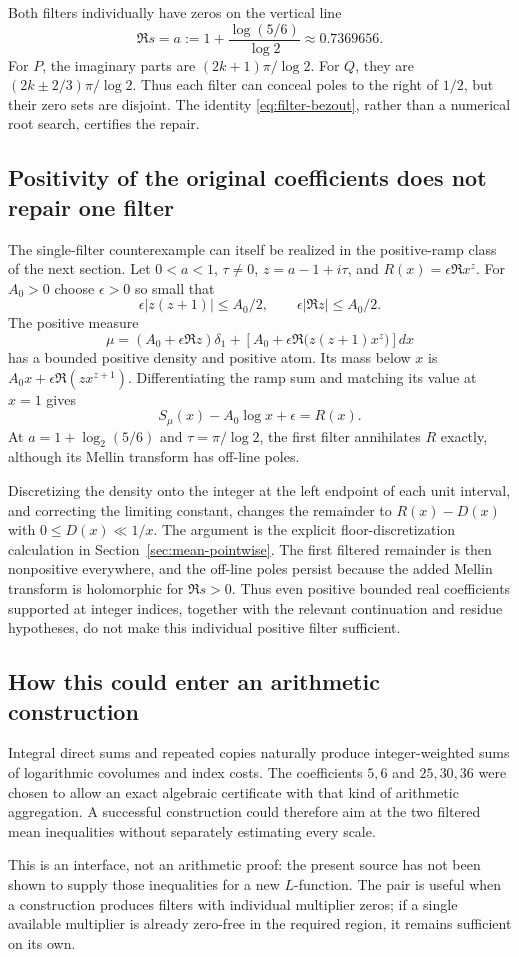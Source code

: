 Both filters individually have zeros on the vertical line
\[
 \Re s=a:=1+\frac{\log(5/6)}{\log2}\approx0.7369656.
\]
For $P$, the imaginary parts are $(2k+1)\pi/\log2$. For $Q$, they are $(2k\pm2/3)\pi/\log2$. Thus each filter can conceal poles to the right of $1/2$, but their zero sets are disjoint. The identity \eqref{eq:filter-bezout}, rather than a numerical root search, certifies the repair.

\subsection{Positivity of the original coefficients does not repair one filter}

The single-filter counterexample can itself be realized in the positive-ramp class of the next section. Let $0<a<1$, $\tau\ne0$, $z=a-1+i\tau$, and
$R(x)=\epsilon\Re x^z$. For $A_0>0$ choose $\epsilon>0$ so small that
\[
 \epsilon|z(z+1)|\le A_0/2,
 \qquad \epsilon|\Re z|\le A_0/2.
\]
The positive measure
\[
 \mu=(A_0+\epsilon\Re z)\delta_1+
 \left[A_0+\epsilon\Re\bigl(z(z+1)x^z\bigr)\right]dx
\]
has a bounded positive density and positive atom. Its mass below $x$ is
$A_0x+\epsilon\Re(zx^{z+1})$. Differentiating the ramp sum and matching its value at $x=1$ gives
\[
 S_\mu(x)-A_0\log x+\epsilon=R(x).
\]
At $a=1+\log_2(5/6)$ and $\tau=\pi/\log2$, the first filter annihilates $R$ exactly, although its Mellin transform has off-line poles.

Discretizing the density onto the integer at the left endpoint of each unit interval, and correcting the limiting constant, changes the remainder to $R(x)-D(x)$ with $0\le D(x)\ll1/x$. The argument is the explicit floor-discretization calculation in Section~\ref{sec:mean-pointwise}. The first filtered remainder is then nonpositive everywhere, and the off-line poles persist because the added Mellin transform is holomorphic for $\Re s>0$. Thus even positive bounded real coefficients supported at integer indices, together with the relevant continuation and residue hypotheses, do not make this individual positive filter sufficient.

\subsection{How this could enter an arithmetic construction}

Integral direct sums and repeated copies naturally produce integer-weighted sums of logarithmic covolumes and index costs. The coefficients $5,6$ and $25,30,36$ were chosen to allow an exact algebraic certificate with that kind of arithmetic aggregation. A successful construction could therefore aim at the two filtered mean inequalities without separately estimating every scale.

This is an interface, not an arithmetic proof: the present source has not been shown to supply those inequalities for a new $L$-function. The pair is useful when a construction produces filters with individual multiplier zeros; if a single available multiplier is already zero-free in the required region, it remains sufficient on its own.
